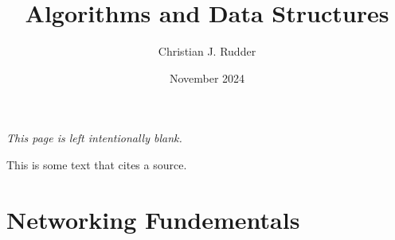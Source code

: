 \documentclass{memoir}
\title{Algorithms and Data Structures}
\author{Christian J. Rudder}
\date{November 2024}
\begin{document}
\maketitle
\setcounter{tocdepth}{2}

\tableofcontents

\newpage
\thispagestyle{empty}
\mbox{}
\vfill
\begin{center}
    \textit{This page is left intentionally blank.}
\end{center}
\vfill
\newpage

This is some text that cites a source.\cite{examplebook}

\chapter{Networking Fundementals}



\end{document}
